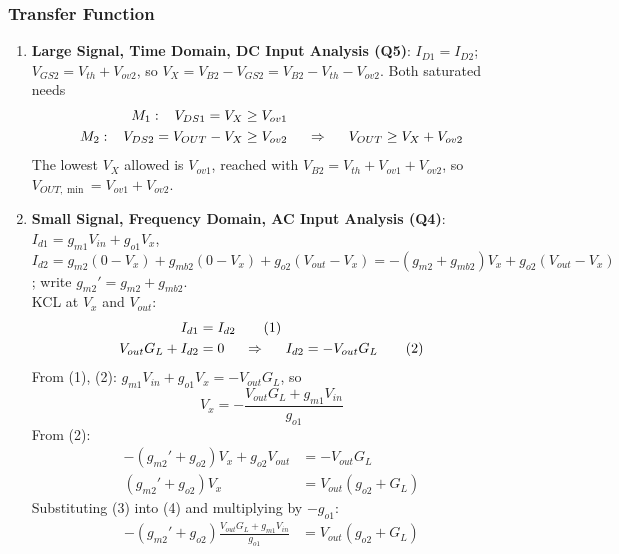 \subsubsection{Transfer Function}
\begin{enumerate}
  \item \textbf{Large Signal, Time Domain, DC Input Analysis (Q5)}:
    \(I_{D1} = I_{D2}\); \(V_{GS2} = V_{th} + V_{ov2}\), so
    \(V_X = V_{B2} - V_{GS2} = V_{B2} - V_{th} - V_{ov2}\). Both saturated needs
    \begin{align*}
      M_1: \hspace{0.3cm} V_{DS1} = V_X &\geq V_{ov1} \\
      M_2: \hspace{0.3cm} V_{DS2} = V_{OUT} - V_X &\geq V_{ov2} \hspace{0.5cm} \Rightarrow \hspace{0.5cm} V_{OUT} \geq V_X + V_{ov2}
    \end{align*}
    The lowest \(V_X\) allowed is \(V_{ov1}\), reached with
    \(V_{B2} = V_{th} + V_{ov1} + V_{ov2}\), so
    \(V_{OUT,\min} = V_{ov1} + V_{ov2}\).
  \item \textbf{Small Signal, Frequency Domain, AC Input Analysis (Q4)}:
    \(I_{d1} = g_{m1} V_{in} + g_{o1} V_x\),
    \(I_{d2} = g_{m2}(0 - V_x) + g_{mb2}(0 - V_x) + g_{o2}(V_{out} - V_x) = -(g_{m2} + g_{mb2}) V_x + g_{o2}(V_{out} - V_x)\); write
    \(g_{m2}' = g_{m2} + g_{mb2}\).\\
    KCL at \(V_x\) and \(V_{out}\):
    \begin{align*}
      I_{d1} &= I_{d2} \tag{1} \\
      V_{out} G_L + I_{d2} &= 0 \hspace{0.5cm} \Rightarrow \hspace{0.5cm} I_{d2} = -V_{out} G_L \tag{2}
    \end{align*}
    From (1), (2): \(g_{m1} V_{in} + g_{o1} V_x = -V_{out} G_L\), so
    \[
      V_x = -\frac{V_{out} G_L + g_{m1} V_{in}}{g_{o1}} \tag{3}
    \]
    From (2):
    \begin{align*}
      -(g_{m2}' + g_{o2}) V_x + g_{o2} V_{out} &= -V_{out} G_L \\
      (g_{m2}' + g_{o2}) V_x &= V_{out}(g_{o2} + G_L) \tag{4}
    \end{align*}
    Substituting (3) into (4) and multiplying by \(-g_{o1}\):
    \begin{align*}
      -(g_{m2}' + g_{o2})\frac{V_{out} G_L + g_{m1} V_{in}}{g_{o1}} &= V_{out}(g_{o2} + G_L) \\

\end{align*}
\end{enumerate}
